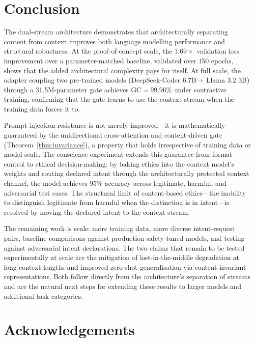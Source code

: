 \documentclass[11pt,a4paper]{article}
\theoremstyle{definition}
\begin{document}
\section{Conclusion}

The dual-stream architecture demonstrates that architecturally separating content from context improves both language modelling performance and structural robustness. At the proof-of-concept scale, the $1.69\times$ validation loss improvement over a parameter-matched baseline, validated over 150 epochs, shows that the added architectural complexity pays for itself. At full scale, the adapter coupling two pre-trained models (DeepSeek-Coder 6.7B + Llama 3.2 3B) through a 31.5M-parameter gate achieves $\text{GC} = 99.96\%$ under contrastive training, confirming that the gate learns to use the context stream when the training data forces it to.

Prompt injection resistance is not merely improved---it is mathematically guaranteed by the unidirectional cross-attention and content-driven gate (Theorem~\ref{thm:invariance}), a property that holds irrespective of training data or model scale. The conscience experiment extends this guarantee from format control to ethical decision-making: by baking ethics into the context model's weights and routing declared intent through the architecturally protected context channel, the model achieves 95\% accuracy across legitimate, harmful, and adversarial test cases. The structural limit of content-based ethics---the inability to distinguish legitimate from harmful when the distinction is in intent---is resolved by moving the declared intent to the context stream.

The remaining work is scale: more training data, more diverse intent-request pairs, baseline comparisons against production safety-tuned models, and testing against adversarial intent declarations. The two claims that remain to be tested experimentally at scale are the mitigation of lost-in-the-middle degradation at long context lengths and improved zero-shot generalisation via content-invariant representations. Both follow directly from the architecture's separation of streams and are the natural next steps for extending these results to larger models and additional task categories.

\section*{Acknowledgements}
\end{document}
